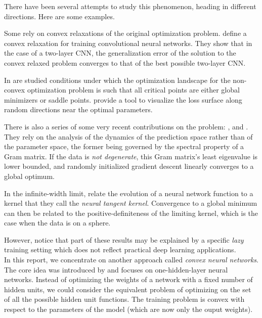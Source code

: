 \documentclass[a4paper, 11pt]{scrartcl}
\begin{document}
{There have been several attempts to study this phenomenon, heading in different directions. Here are some examples.

Some rely on convex relaxations of the original optimization problem. \cite{zhang2016convexified} define a convex relaxation for training convolutional neural networks. They show that in the case of a two-layer CNN, the generalization error of the solution to the convex relaxed problem converges to that of the best possible two-layer CNN.

In \cite{haeffele2017global} are studied conditions under which the optimization landscape for the non-convex optimization problem is such that all critical points are either global minimizers or saddle points. \cite{visualloss} provide a tool to visualize the loss surface along random directions near the optimal parameters.

There is also a series of some very recent contributions on the problem: \cite{du2018agradient}, \cite{du2018bgradient} and \cite{zou2018stochastic}. They rely on the analysis of the dynamics of the prediction space rather than of the parameter space, the former being governed by the spectral property of a Gram matrix. If the data is \textit{not degenerate}, this Gram matrix’s least eigenvalue is lower bounded, and randomly initialized gradient descent linearly converges to a global optimum.

In the infinite-width limit, \cite{jacot2018neural} relate the evolution of a neural network function to a kernel that they call the \textit{neural tangent kernel}. Convergence to a global minimum can then be related to the positive-definiteness of the limiting kernel, which is the case when the data is on a sphere.

However, \cite{chizat:hal-01945578} notice that part of these results may be explained by a specific \textit{lazy} training setting which does not reflect practical deep learning applications. \\

In this report, we concentrate on another approach called \textit{convex neural networks}. The core idea was introduced by \cite{bengio2006convex} and focuses on one-hidden-layer neural networks. Instead of optimizing the weights of a network with a fixed number of hidden units, we could consider the equivalent problem of optimizing on the set of all the possible hidden unit functions. The training problem is convex with respect to the parameters of the model (which are now only the ouput weights).

}
\end{document}
